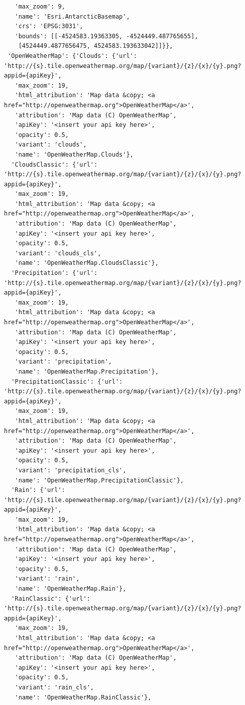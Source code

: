 \documentclass[
  letterpaper,
  DIV=11,
  numbers=noendperiod]{scrreprt}
\begin{document}
\begin{verbatim}
   'max_zoom': 9,
   'name': 'Esri.AntarcticBasemap',
   'crs': 'EPSG:3031',
   'bounds': [[-4524583.19363305, -4524449.487765655],
    [4524449.4877656475, 4524583.193633042]]}},
 'OpenWeatherMap': {'Clouds': {'url': 'http://{s}.tile.openweathermap.org/map/{variant}/{z}/{x}/{y}.png?appid={apiKey}',
   'max_zoom': 19,
   'html_attribution': 'Map data &copy; <a href="http://openweathermap.org">OpenWeatherMap</a>',
   'attribution': 'Map data (C) OpenWeatherMap',
   'apiKey': '<insert your api key here>',
   'opacity': 0.5,
   'variant': 'clouds',
   'name': 'OpenWeatherMap.Clouds'},
  'CloudsClassic': {'url': 'http://{s}.tile.openweathermap.org/map/{variant}/{z}/{x}/{y}.png?appid={apiKey}',
   'max_zoom': 19,
   'html_attribution': 'Map data &copy; <a href="http://openweathermap.org">OpenWeatherMap</a>',
   'attribution': 'Map data (C) OpenWeatherMap',
   'apiKey': '<insert your api key here>',
   'opacity': 0.5,
   'variant': 'clouds_cls',
   'name': 'OpenWeatherMap.CloudsClassic'},
  'Precipitation': {'url': 'http://{s}.tile.openweathermap.org/map/{variant}/{z}/{x}/{y}.png?appid={apiKey}',
   'max_zoom': 19,
   'html_attribution': 'Map data &copy; <a href="http://openweathermap.org">OpenWeatherMap</a>',
   'attribution': 'Map data (C) OpenWeatherMap',
   'apiKey': '<insert your api key here>',
   'opacity': 0.5,
   'variant': 'precipitation',
   'name': 'OpenWeatherMap.Precipitation'},
  'PrecipitationClassic': {'url': 'http://{s}.tile.openweathermap.org/map/{variant}/{z}/{x}/{y}.png?appid={apiKey}',
   'max_zoom': 19,
   'html_attribution': 'Map data &copy; <a href="http://openweathermap.org">OpenWeatherMap</a>',
   'attribution': 'Map data (C) OpenWeatherMap',
   'apiKey': '<insert your api key here>',
   'opacity': 0.5,
   'variant': 'precipitation_cls',
   'name': 'OpenWeatherMap.PrecipitationClassic'},
  'Rain': {'url': 'http://{s}.tile.openweathermap.org/map/{variant}/{z}/{x}/{y}.png?appid={apiKey}',
   'max_zoom': 19,
   'html_attribution': 'Map data &copy; <a href="http://openweathermap.org">OpenWeatherMap</a>',
   'attribution': 'Map data (C) OpenWeatherMap',
   'apiKey': '<insert your api key here>',
   'opacity': 0.5,
   'variant': 'rain',
   'name': 'OpenWeatherMap.Rain'},
  'RainClassic': {'url': 'http://{s}.tile.openweathermap.org/map/{variant}/{z}/{x}/{y}.png?appid={apiKey}',
   'max_zoom': 19,
   'html_attribution': 'Map data &copy; <a href="http://openweathermap.org">OpenWeatherMap</a>',
   'attribution': 'Map data (C) OpenWeatherMap',
   'apiKey': '<insert your api key here>',
   'opacity': 0.5,
   'variant': 'rain_cls',
   'name': 'OpenWeatherMap.RainClassic'},

\end{verbatim}
\end{document}
